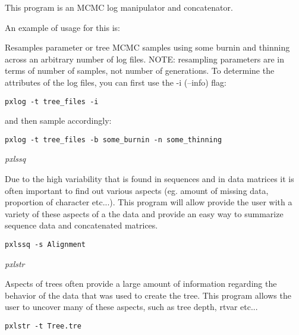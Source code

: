 \documentclass[12pt,letterpaper]{article}
\renewcommand{\subsection}[1]{%
\bigskip
\begin{center}
\begin{large}
\normalfont\itshape #1
\end{large}
\end{center}}
\begin{document}
This program is an MCMC log manipulator and concatenator. 

An example of usage for this is:

Resamples parameter or tree MCMC samples using some burnin and thinning across an arbitrary number of log files. NOTE: resampling parameters are in terms of number of samples, not number of generations. To determine the attributes of the log files, you can first use the -i (--info) flag:

\begin{flushleft}
\begin{verbatim}
pxlog -t tree_files -i
\end{verbatim}
\end{flushleft}
and then sample accordingly:
\begin{flushleft}
\begin{verbatim}
pxlog -t tree_files -b some_burnin -n some_thinning
\end{verbatim}
\end{flushleft}

\subsection{pxlssq}

Due to the high variability that is found in sequences and in data matrices it is often important to find out various aspects (eg. amount of missing data, proportion of character etc...). This program will allow provide the user with a variety of these aspects of a the data and provide an easy way to summarize sequence data and concatenated matrices.

\begin{flushleft}
\begin{verbatim}
pxlssq -s Alignment
\end{verbatim}
\end{flushleft}

\subsection{pxlstr}

Aspects of trees often provide a large amount of information regarding the behavior of the data that was used to create the tree. This program allows the user to uncover many of these aspects, such as tree depth, rtvar etc...

\begin{flushleft}
\begin{verbatim}
pxlstr -t Tree.tre
\end{verbatim}
\end{flushleft}
\end{document}
